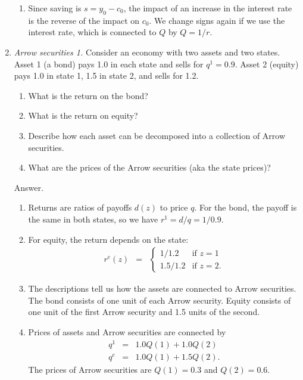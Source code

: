 \begin{enumerate}
\begin{enumerate}
\item Since saving is $ s = y_0-c_0$,
the impact of an increase in the interest rate is the reverse of the impact on $c_0$.
We change signs again if we use the interest rate, which is connected to $Q$ by $Q=1/r$.

\end{enumerate}

\item {\it Arrow securities 1.\/}
Consider an economy with two assets and two states.
Asset 1 (a bond) pays 1.0 in each state and sells for $q^1 = 0.9$.
Asset 2 (equity) pays 1.0 in state 1, 1.5 in state 2, and sells for 1.2.
\begin{enumerate}
\item What is the return on the bond?
\item What is the return on equity?
\item Describe how each asset can be decomposed into a collection of Arrow securities.
\item What are the prices of the Arrow securities (aka the state prices)?
\end{enumerate}
%
Answer.
\begin{enumerate}
\item Returns are ratios of payoffs $d(z)$ to price $q$.
For the bond, the payoff is the same in both states, so we have
$ r^1 = d/q = 1/0.9 $.
\item For equity, the return depends on the state:
\begin{eqnarray*}
    r^e(z) &=& \left\{
                \begin{array}{ll}
                1/1.2 & \mbox{if } z=1 \\  1.5/1.2 & \mbox{if } z=2 .
                \end{array}
                \right.
\end{eqnarray*}
\item The descriptions tell us how the assets are connected to Arrow securities.
The bond consists of one unit of each Arrow security.
Equity consists of one unit of the first Arrow security and 1.5 units of the second.
\item Prices of assets and Arrow securities are connected by
\begin{eqnarray*}
    q^1 &=& 1.0 Q(1) + 1.0 Q(2) \\
    q^e &=& 1.0 Q(1) + 1.5 Q(2) .
\end{eqnarray*}
The prices of Arrow securities are
$Q(1) = 0.3$ and $Q(2) = 0.6$.
\end{enumerate}


\end{enumerate}
